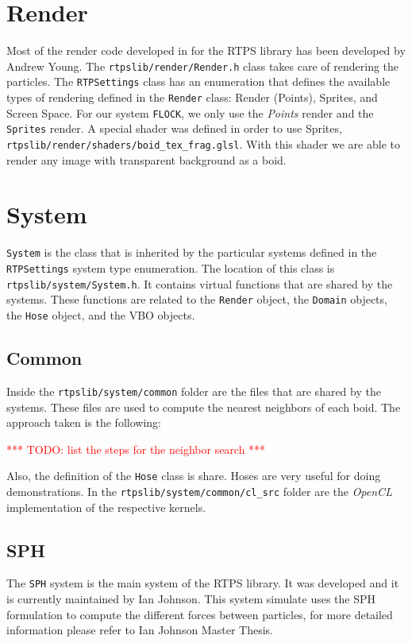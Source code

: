 \section{Render}
Most of the render code developed in for the RTPS library has been developed by Andrew Young. The \texttt{rtpslib/render/Render.h} class takes care of rendering the particles. The \texttt{RTPSettings} class has an enumeration that defines the available types of rendering defined in the \texttt{Render} class: Render (Points), Sprites, and Screen Space. For our system \texttt{FLOCK}, we only use the \textit{Points} render and the \texttt{Sprites} render. A special shader was defined in order to use Sprites, \texttt{rtpslib/render/shaders/boid\_tex\_frag.glsl}. With this shader we are able to render any image with transparent background as a boid.

\section{System}
\texttt{System} is the class that is inherited by the particular systems defined in the \texttt{RTPSettings} system type enumeration. The location of this class is \texttt{rtpslib/system/System.h}. It contains virtual functions that are shared by the systems. These functions are related to the \texttt{Render} object,  the \texttt{Domain} objects, the \texttt{Hose} object, and the VBO objects.

\subsection{Common}
Inside the \texttt{rtpslib/system/common} folder are the files that are shared by the systems. These files are used to compute the nearest neighbors of each boid. The approach taken is the following:

\textcolor{red}{*** TODO:  list the steps for the neighbor search ***}

Also, the definition of the \texttt{Hose} class is share. Hoses are very useful for doing demonstrations. In the \texttt{rtpslib/system/common/cl\_src} folder are the \textit{OpenCL} implementation of the respective kernels.

\subsection{SPH}
The \texttt{SPH} system is the main system of the RTPS library. It was developed and it is currently maintained by Ian Johnson\cite{ianBlog}\cite{ianPaper}. This system simulate uses the SPH formulation to compute the different forces between particles, for more detailed information please refer to Ian Johnson Master Thesis\cite{ianThesis}.

